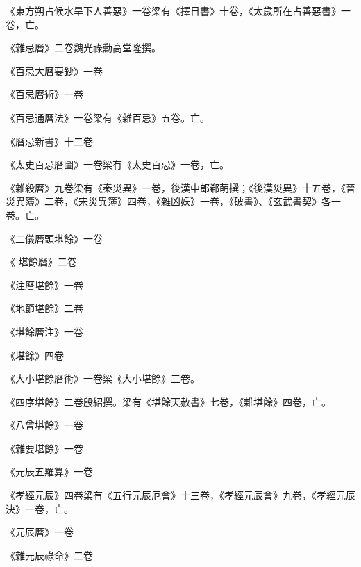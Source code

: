 \begin{pinyinscope}
 《東方朔占候水旱下人善惡》一卷梁有《擇日書》十卷，《太歲所在占善惡書》一卷，亡。



 《雜忌曆》二卷魏光祿勳高堂隆撰。



 《百忌大曆要鈔》一卷



 《百忌曆術》一卷



 《百忌通曆法》一卷梁有《雜百忌》五卷。亡。



 《曆忌新書》十二卷



 《太史百忌曆圖》一卷梁有《太史百忌》一卷，亡。



 《雜殺曆》九卷梁有《秦災異》一卷，後漢中郎郗萌撰；《後漢災異》十五卷，《晉災異簿》二卷，《宋災異簿》四卷，《雜凶妖》一卷，《破書》、《玄武書契》各一卷。亡。



 《二儀曆頭堪餘》一卷



 《
 堪餘曆》二卷



 《注曆堪餘》一卷



 《地節堪餘》二卷



 《堪餘曆注》一卷



 《堪餘》四卷



 《大小堪餘曆術》一卷梁《大小堪餘》三卷。



 《四序堪餘》二卷殷紹撰。梁有《堪餘天赦書》七卷，《雜堪餘》四卷，亡。



 《八曾堪餘》一卷



 《雜要堪餘》一卷



 《元辰五羅算》一卷



 《孝經元辰》四卷梁有《五行元辰厄會》十三卷，《孝經元辰會》九卷，《孝經元辰決》一卷，亡。



 《元辰曆》一卷



 《雜元辰祿命》二卷




\end{pinyinscope}
